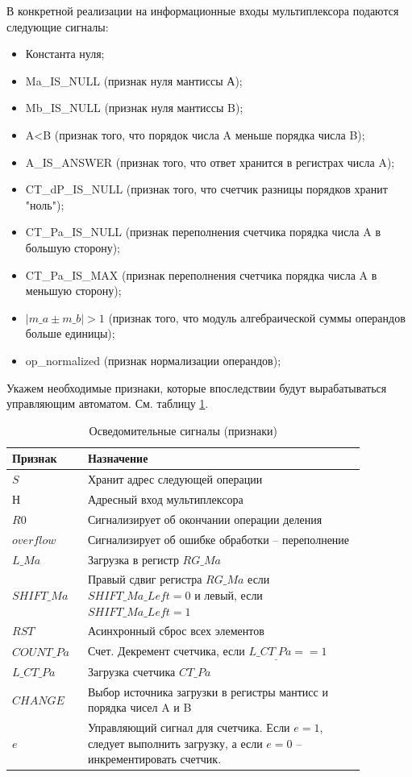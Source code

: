 \documentclass[a4paper,14pt]{extarticle}
\begin{document}
В конкретной реализации на информационные входы мультиплексора подаются следующие сигналы:
\hypertarget{name}{}
\begin{itemize}
	\small
	\item Константа нуля;
	\item Ma\_IS\_NULL (признак нуля мантиссы А);
	\item Mb\_IS\_NULL (признак нуля мантиссы B);
	\item A<B (признак того, что порядок числа A меньше порядка числа B);
	\item A\_IS\_ANSWER (признак того, что ответ хранится в регистрах числа A);
	\item CT\_dP\_IS\_NULL (признак того, что счетчик разницы порядков хранит "ноль");
	\item CT\_Pa\_IS\_NULL (признак переполнения счетчика порядка числа A в большую сторону);
	\item CT\_Pa\_IS\_MAX  (признак переполнения счетчика порядка числа A в меньшую сторону);
	\item $\left|m\_a\pm m\_b\right|>1$ (признак того, что модуль алгебраической суммы операндов больше единицы);
	\item op\_normalized (признак нормализации операндов);
\end{itemize}

Укажем необходимые признаки, которые впоследствии будут вырабатываться управляющим автоматом. См. таблицу \ref{tab:signals5}.
\begin{table}[h!]
	\centering
	\small
	\begin{tabular}{|m{0.17\linewidth}|m{0.7\linewidth}|}
		\hline
		\textbf{Признак} & \textbf{Назначение} \\ \hline
		$S$ & Хранит адрес следующей операции \\ \hline
		$Н$ & Адресный вход мультиплексора \\ \hline
		$R0$ & Сигнализирует об окончании операции деления \\ \hline
		$overflow$ & Сигнализирует об ошибке обработки -- переполнение \\ \hline
		$L\_Ma$ & Загрузка в регистр $RG\_Ma$ \\ \hline
		$SHIFT\_Ma$ & Правый сдвиг регистра $RG\_Ma$ если $SHIFT\_Ma\_Left=0$ и левый, если  $SHIFT\_Ma\_Left=1$ \\ \hline
		$RST$ & Асинхронный сброс всех элементов \\ \hline
		$COUNT\_Pa$ & Счет. Декремент счетчика, если $L\_CT_\_Pa==1$ \\ \hline
		$L\_CT\_Pa$ & Загрузка счетчика $CT\_Pa$ \\ \hline
		$CHANGE$ & Выбор источника загрузки в регистры мантисс и порядка чисел A и B \\ \hline
		$e$ & Управляющий сигнал для счетчика. Если $e=1$, следует выполнить загрузку, а если $e=0$ -- инкрементировать счетчик. \\ \hline
	\end{tabular}
	\caption{Осведомительные сигналы (признаки)}
	\label{tab:signals5}
\end{table}
\end{document}
